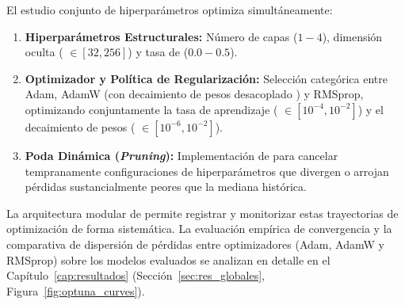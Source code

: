 El estudio conjunto de hiperparámetros optimiza simultáneamente:
\begin{enumerate}
    \item \textbf{Hiperparámetros Estructurales:} Número de capas ($1 - 4$), dimensión oculta ( $\in [32, 256]$) y tasa de  ($0.0 - 0.5$).
    \item \textbf{Optimizador y Política de Regularización:} Selección categórica entre Adam, AdamW (con decaimiento de pesos desacoplado \cite{loshchilov2018decoupled}) y RMSprop, optimizando conjuntamente la tasa de aprendizaje ( $\in [10^{-4}, 10^{-2}]$) y el decaimiento de pesos ( $\in [10^{-6}, 10^{-2}]$).
    \item \textbf{Poda Dinámica (\textit{Pruning}):} Implementación de  para cancelar tempranamente configuraciones de hiperparámetros que divergen o arrojan pérdidas sustancialmente peores que la mediana histórica.
\end{enumerate}

La arquitectura modular de  permite registrar y monitorizar estas trayectorias de optimización de forma sistemática. La evaluación empírica de convergencia y la comparativa de dispersión de pérdidas entre optimizadores (Adam, AdamW y RMSprop) sobre los modelos evaluados se analizan en detalle en el Capítulo~\ref{cap:resultados} (Sección~\ref{sec:res_globales}, Figura~\ref{fig:optuna_curves}).
